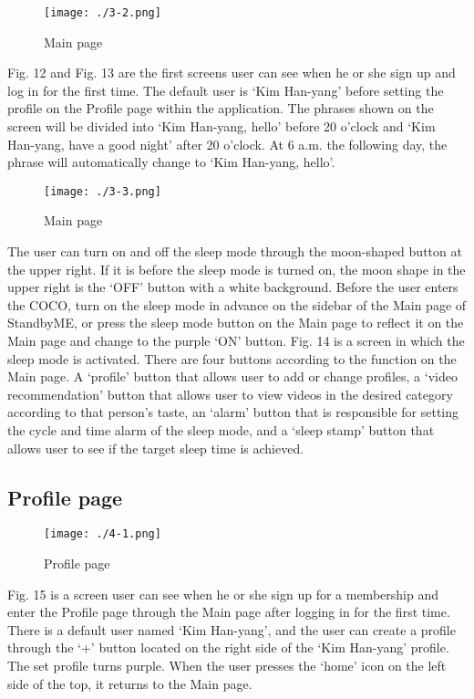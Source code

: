 \documentclass[conference]{IEEEtran}
\begin{document}
\begin{figure}[H]
\texttt{[image: ./3-2.png]}
\centering
\caption{Main page}
\end{figure}

Fig. 12 and Fig. 13 are the first screens user can see when he or she sign up and log in for the first time. The default user is ‘Kim Han-yang' before setting the profile on the Profile page within the application. The phrases shown on the screen will be divided into ‘Kim Han-yang, hello’ before 20 o'clock and ‘Kim Han-yang, have a good night’ after 20 o'clock. At 6 a.m. the following day, the phrase will automatically change to ‘Kim Han-yang, hello’.

\begin{figure}[H]
\texttt{[image: ./3-3.png]}
\centering
\caption{Main page}
\end{figure}

The user can turn on and off the sleep mode through the moon-shaped button at the upper right. If it is before the sleep mode is turned on, the moon shape in the upper right is the ‘OFF’ button with a white background. Before the user enters the COCO, turn on the sleep mode in advance on the sidebar of the Main page of StandbyME, or press the sleep mode button on the Main page to reflect it on the Main page and change to the purple ‘ON’ button. Fig. 14 is a screen in which the sleep mode is activated. There are four buttons according to the function on the Main page. A ‘profile’ button that allows user to add or change profiles, a ‘video recommendation’ button that allows user to view videos in the desired category according to that person's taste, an ‘alarm’ button that is responsible for setting the cycle and time alarm of the sleep mode, and a ‘sleep stamp’ button that allows user to see if the target sleep time is achieved.

\subsection{Profile page}
\begin{figure}[H]
\texttt{[image: ./4-1.png]}
\centering
\caption{Profile page}
\end{figure}

Fig. 15 is a screen user can see when he or she sign up for a membership and enter the Profile page through the Main page after logging in for the first time. There is a default user named ‘Kim Han-yang’, and the user can create a profile through the ‘+’ button located on the right side of the ‘Kim Han-yang’ profile. The set profile turns purple. When the user presses the ‘home’ icon on the left side of the top, it returns to the Main page.
\end{document}
